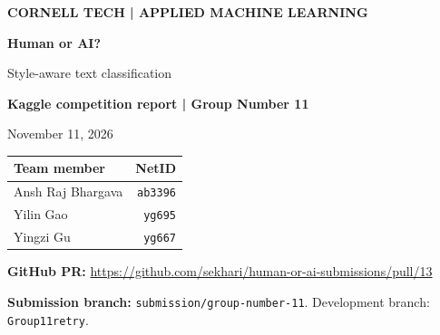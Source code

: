 \documentclass[10pt,letterpaper]{article}
\begin{document}
\thispagestyle{empty}
{\color{teal}\bfseries CORNELL TECH | APPLIED MACHINE LEARNING}\par
\vspace{0.18in}
{\Huge\bfseries\color{navy}Human or AI?}\par
\vspace{0.07in}
{\LARGE\color{navy}Style-aware text classification}\par
\vspace{0.16in}
\textbf{Kaggle competition report | Group Number 11}\par

November 11, 2026\par\vspace{0.1in}
\begin{tabularx}{\linewidth}{@{}Yr@{}}
\toprule
Team member & NetID \\ \midrule
Ansh Raj Bhargava & \texttt{ab3396} \\
Yilin Gao & \texttt{yg695} \\
Yingzi Gu & \texttt{yg667} \\
\bottomrule
\end{tabularx}

\textbf{GitHub PR:} \url{https://github.com/sekhari/human-or-ai-submissions/pull/13}\par
\textbf{Submission branch:} \texttt{submission/group-number-11}. Development branch: \texttt{Group11retry}.
\end{document}
